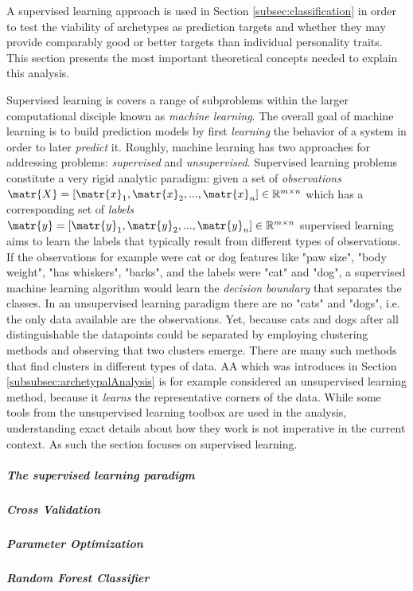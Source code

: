 A supervised learning approach is used in Section \ref{subsec:classification} in order to test the viability of archetypes as prediction targets and whether they may provide comparably good or better targets than individual personality traits. This section presents the most important theoretical concepts needed to explain this analysis.

Supervised learning is covers a range of subproblems within the larger computational disciple known as \textit{machine learning}. The overall goal of machine learning is to build prediction models by first \textit{learning} the behavior of a system in order to later \textit{predict} it. Roughly, machine learning has two approaches for addressing problems: \textit{supervised} and \textit{unsupervised}. Supervised learning problems constitute a very rigid analytic paradigm: given a set of \textit{observations} $\matr{X} = [\matr{x}_1, \matr{x}_2, ..., \matr{x}_n] \in \mathbb{R}^{m \times n}$ which has a corresponding set of \textit{labels} $\matr{y} = [\matr{y}_1, \matr{y}_2, ..., \matr{y}_n] \in \mathbb{R}^{m \times n}$ supervised learning aims to learn the labels that typically result from different types of observations. If the observations for example were cat or dog features like "paw size", "body weight", "has whiskers", "barks", and the labels were "cat" and "dog", a supervised machine learning algorithm would learn the \textit{decision boundary} that separates the classes. In an unsupervised learning paradigm there are no "cats" and "dogs", i.e. the only data available are the observations. Yet, because cats and dogs after all distinguishable the datapoints could be separated by employing clustering methods and observing that two clusters emerge. There are many such methods that find clusters in different types of data. AA which was introduces in Section \ref{subsubsec:archetypalAnalysis} is for example considered an unsupervised learning method, because it \textit{learns} the representative corners of the data. While some tools from the unsupervised learning toolbox are used in the analysis, understanding exact details about how they work is not imperative in the current context. As such the section focuses on supervised learning.

\subparagraph{The supervised learning paradigm}


\subparagraph{Cross Validation}


\subparagraph{Parameter Optimization}


\subparagraph{Random Forest Classifier}
